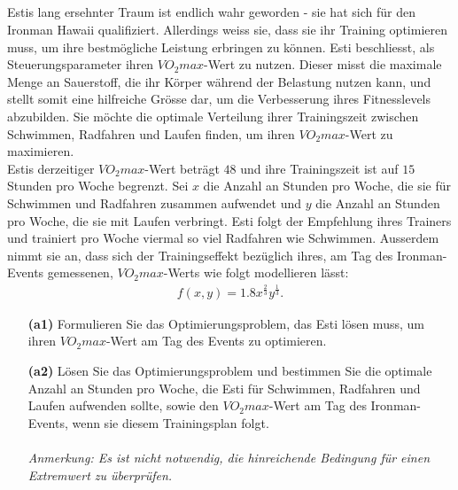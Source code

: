 \subsection*{}
Estis lang ersehnter Traum ist endlich wahr geworden
- 
sie hat sich für den Ironman Hawaii qualifiziert.
Allerdings weiss sie, dass sie ihr Training optimieren muss, um ihre bestmögliche Leistung erbringen zu können.
Esti beschliesst, als Steuerungsparameter ihren $VO_2max$-Wert zu nutzen.
Dieser misst die maximale Menge an Sauerstoff, die ihr Körper während der Belastung nutzen kann, und stellt somit eine hilfreiche Grösse dar, um die Verbesserung ihres Fitnesslevels abzubilden.
Sie möchte die optimale Verteilung ihrer Trainingszeit zwischen
Schwimmen, Radfahren und Laufen finden, um ihren $VO_2max$-Wert zu maximieren.\\
Estis derzeitiger $VO_2max$-Wert beträgt $48$ und ihre Trainingszeit ist auf $15$ Stunden pro Woche begrenzt.
Sei $x$ die Anzahl an Stunden pro Woche, die sie für Schwimmen und Radfahren zusammen aufwendet und $y$ die Anzahl an Stunden pro Woche, die sie mit Laufen verbringt.
Esti folgt der Empfehlung ihres Trainers und trainiert pro Woche viermal so viel Radfahren wie Schwimmen. Ausserdem nimmt sie an, dass sich der Trainingseffekt bezüglich ihres, am Tag des Ironman-Events gemessenen, $VO_2max$-Werts wie folgt modellieren lässt:
\begin{align*}
	f(x,y) = 1.8 x^{\frac{2}{3}} y^{\frac{1}{3}}.
\end{align*}
\begin{enumerate}
	\item[\textbf{(a1)}]
	Formulieren Sie das Optimierungsproblem, das Esti lösen muss, um ihren $VO_2max$-Wert am Tag des Events zu optimieren.
	\item[\textbf{(a2)}] 
	Lösen Sie das Optimierungsproblem und bestimmen Sie die optimale Anzahl an Stunden pro Woche, die Esti für Schwimmen, Radfahren und Laufen aufwenden sollte, sowie den $VO_2max$-Wert am Tag des Ironman-Events, wenn sie diesem Trainingsplan folgt.\\
	\\
	\textit{Anmerkung: Es ist nicht notwendig, die hinreichende Bedingung für einen Extremwert zu überprüfen.}
\end{enumerate}
\ \\
\newpage
